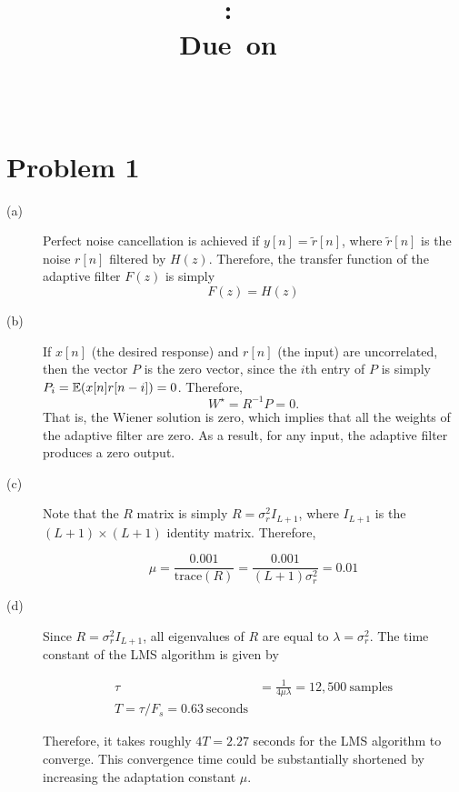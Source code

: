 \documentclass{article}
\title{
\vspace{2in}
\textmd{\textbf{\hmwkClass:\ \hmwkTitle}}\\
\normalsize\vspace{0.1in}\small{Due\ on\ \hmwkDueDate}\\
\vspace{0.1in}\large{\textit{\hmwkClassInstructor\ \hmwkClassTime}}
\vspace{3in}
}
\author{\textbf{\hmwkAuthorName}}
\date{} %
\begin{document}
	
\section{Problem 1}
\begin{description}

\item[(a)] Perfect noise cancellation is achieved if $y[n] = \tilde{r}[n]$, where $\tilde{r}[n]$ is the noise $r[n]$ filtered by $H(z)$. Therefore, the transfer function of the adaptive filter $F(z)$ is simply
\begin{equation}
	F(z) = H(z)
\end{equation}

\item[(b)] If $x[n]$ (the desired response) and $r[n]$ (the input) are uncorrelated, then the vector $P$ is the zero vector, since the $i$th entry of $P$ is simply $P_i = \operatorname{\mathbb{E}}(x[n]r[n - i]) = 0$. Therefore,
\begin{equation}
	W^\star = R^{-1}P = 0.
\end{equation}
That is, the Wiener solution is zero, which implies that all the weights of the adaptive filter are zero. As a result, for any input, the adaptive filter produces a zero output.

\item[(c)] Note that the $R$ matrix is simply $R = \sigma^2_r I_{L+1}$, where $I_{L+1}$ is the $(L+1)\times (L+1)$ identity matrix. Therefore, 

\begin{equation}
	\mu = \frac{0.001}{\mathrm{trace}(R)} = \frac{0.001}{(L+1)\sigma_r^2} = 0.01
\end{equation}

\item[(d)] Since $R = \sigma^2_rI_{L+1}$, all eigenvalues of $R$ are equal to $\lambda = \sigma_r^2$. The time constant of the LMS algorithm is given by

\begin{align}
	\tau &= \frac{1}{4\mu\lambda} = 12,500~\text{samples} \\
	T = \tau/F_s = 0.63~\text{seconds}
\end{align}

Therefore, it takes roughly $4T = 2.27$ seconds for the LMS algorithm to converge. This
convergence time could be substantially shortened by increasing the adaptation constant
 $\mu$.
 

\end{description}
\end{document}
